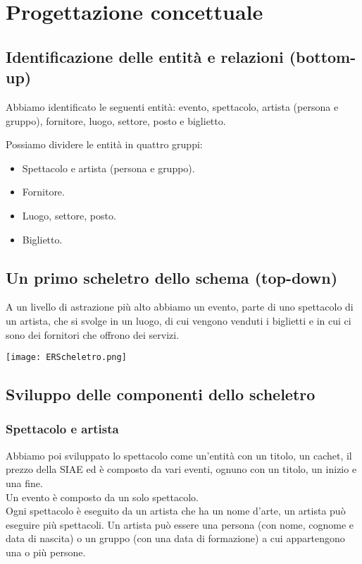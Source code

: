 \documentclass[a4paper,11pt]{article}
\begin{document}
\section{Progettazione concettuale}

\subsection{Identificazione delle entità e relazioni (bottom-up)}

Abbiamo identificato le seguenti entità: evento, spettacolo, artista (persona e gruppo), fornitore, luogo, settore, posto e biglietto.

Possiamo dividere le entità in quattro gruppi:

\begin{itemize}
    \item Spettacolo e artista (persona e gruppo).
    \item Fornitore.
    \item Luogo, settore, posto.
    \item Biglietto.
\end{itemize}

\subsection{Un primo scheletro dello schema (top-down)}

A un livello di astrazione più alto abbiamo un evento, parte di uno spettacolo di un artista, che si svolge in un luogo, di cui vengono venduti i biglietti e in cui ci sono dei fornitori che offrono dei servizi.

\texttt{[image: ERScheletro.png]}
 
\subsection{Sviluppo delle componenti dello scheletro}

\subsubsection*{Spettacolo e artista}

Abbiamo poi sviluppato lo spettacolo come un'entità con un titolo, un cachet, il prezzo della SIAE ed è composto da vari eventi, ognuno con un titolo, un inizio e una fine.\\
Un evento è composto da un solo spettacolo.\\
Ogni spettacolo è eseguito da un artista che ha un nome d'arte, un artista può eseguire più spettacoli.
Un artista può essere una persona (con nome, cognome e data di nascita) o un gruppo (con una data di formazione) a cui appartengono una o più persone.
\end{document}
